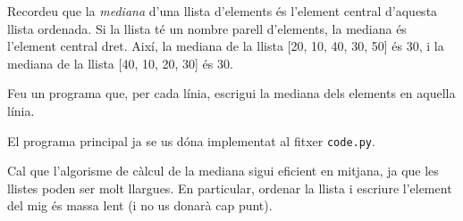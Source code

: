 
\Statement

Recordeu que la \emph{mediana} d'una llista d'elements és l'element central d'aquesta llista ordenada. Si la llista té un nombre parell d'elements, la mediana és l'element central dret. Així, la mediana de la llista [20, 10, 40, 30, 50] és 30, i la mediana de la llista [40, 10, 20, 30] és 30.

\medskip

Feu un programa que, per cada línia, escrigui la mediana dels elements en aquella línia.

\medskip

El programa principal ja se us dóna implementat al fitxer \texttt{code.py}.

\medskip

Cal que l'algorisme de càlcul de la mediana sigui eficient en mitjana, ja que les llistes poden ser molt llargues. En particular, ordenar la llista i escriure l'element del mig és massa lent (i no us donarà cap punt).

\Sample
